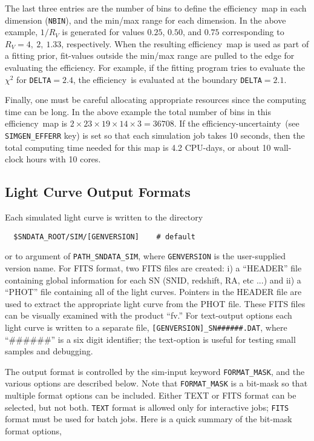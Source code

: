 \documentclass[12pt]{article}
\newcommand{\unc}{uncertainty}
\newcommand{\eff}{efficiency}
\begin{document}
The last three entries are the number of bins to define
the \eff\ map in each dimension ({\tt NBIN}),
and the min/max range for each dimension.
In the above example, $1/R_V$  is generated for values
$0.25$, $0.50$, and $0.75$ corresponding to $R_V = 4,~2,~1.33$,
respectively. When the resulting \eff\ map is used as part
of a fitting prior, fit-values outside the min/max range
are pulled to the edge for evaluating the \eff.
For example, if the fitting program tries to evaluate
the $\chi^2$ for {\tt DELTA}$=2.4$, the \eff\ is
evaluated at the boundary {\tt DELTA}$=2.1$.


Finally, one must be careful allocating appropriate
resources since the computing time can be long.
In the above example the total number of bins in this
\eff\ map is $2\times 23\times 19\times 14\times 3 = 36708$.
If the \eff-\unc\ (see {\tt SIMGEN\_EFFERR} key)
is set so that each simulation job takes 10 seconds,
then the total computing time needed for this map is
4.2 CPU-days, or about 10 wall-clock hours with 10 cores.

  \clearpage
   \subsection{Light Curve Output Formats}
   \label{subsec:sim_formats}

Each simulated light curve is written 
to the directory
\begin{verbatim}
  $SNDATA_ROOT/SIM/[GENVERSION]    # default
\end{verbatim}
or to argument of {\tt PATH\_SNDATA\_SIM},
where {\tt GENVERSION} is the user-supplied version name.
For FITS format, two FITS files are created: 
i) a ``HEADER'' file containing global information 
for each SN (SNID, redshift, RA, etc ...) 
and ii) a ``PHOT'' file containing all of the light curves.
Pointers in the HEADER file are used to extract the
appropriate light curve from the PHOT file.
These FITS files can be visually examined with the product ``fv.''
For text-output options each light curve is written to a
separate file, {\tt [GENVERSION]\_SN\#\#\#\#\#\#.DAT},
where ``\#\#\#\#\#\#'' is a six digit identifier;
the text-option is useful for testing small samples and
debugging. 


The output format is controlled by the sim-input keyword
{\tt FORMAT\_MASK}, and the various options are described
below. Note that {\tt FORMAT\_MASK} is a bit-mask so that
multiple format options can be included.
Either TEXT or FITS format can be selected, but not both.
{\tt TEXT} format is allowed only for interactive jobs; 
{\tt FITS} format must be used for batch jobs.
Here is a quick summary of the bit-mask format options,
%
\end{document}
